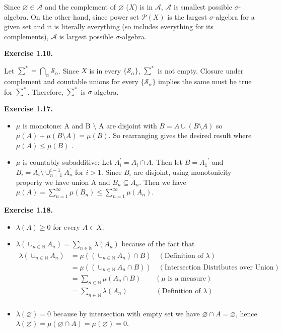 \documentclass[12pt]{article}
\renewcommand{\emptyset}{\varnothing}
\begin{document}
Since $\emptyset \in \mathcal{A}$ and the complement of $\emptyset$ ($X$) is in $\mathcal{A}$, $\mathcal{A}$ is smallest possible $\sigma$-algebra. On the other hand, since power set $\mathcal{P}(X)$ is the largest $\sigma$-algebra for a given set and it is literally everything (so includes everything for its complements), $\mathcal{A}$ is largest possible $\sigma$-algebra.

\textbf{Exercise 1.10.}

Let $\sum^{*} = \bigcap_\alpha \mathcal{S}_\alpha$. Since $X$ is in every $\{\mathcal{S}_\alpha\}$, $\sum^{*}$ is not empty. Closure under complement and countable unions for every  $\{\mathcal{S}_\alpha\}$ implies the same must be true for $\sum^{*}$.  Therefore,  $\sum^{*}$ is $\sigma$-algebra.

\textbf{Exercise 1.17.}

\begin{itemize}
\item $\mu$ is monotone: A and B $\setminus$ A are disjoint with $B = A \cup (B \setminus A)$ so $\mu(A) + \mu (B \setminus A) = \mu(B)$. So rearranging gives the desired result where $\mu(A) \leq \mu(B)$  .

\item  $\mu$ is countably subadditive: Let $A_{i}^{'} = A_{i} \cap A$. Then let $B = {A_{1}}^{'}$ and $B_{i} = A_{i}^{'} \setminus \cup_{n=1}^{i-1} A_{n}^{'}$ for $i>1$. Since $B_{i}$ are disjoint, using monotonicity property we have union A and $B_{n} \subseteq A_{n}$. Then we have $\mu(A) = \sum_{n=1}^{\infty} \mu({B_{n}}) \leq  \sum_{n=1}^{\infty} \mu({A_{n}})$.

\end{itemize}

\textbf{Exercise 1.18.}
\begin{itemize}
\item $\lambda(A) \geq 0$ for every $A \in X$.
\item $\lambda(\cup_{n \in \mathbb{N}} A_{n}) = \sum_{n \in \mathbb{N}} \lambda(A_{n})$ because of the fact that 
\begin{align*}
\lambda(\cup_{n \in \mathbb{N}} A_{n}) & = \mu((\cup_{n \in \mathbb{N}} A_{n}) \cap B) \quad (\text{Definition of $\lambda$})\\ & = \mu((\cup_{n \in \mathbb{N}} A_{n} \cap B)) \quad (\text{Intersection Distributes over Union})\\ & = \sum_{n \in \mathbb{N}} \mu(A_{n} \cap B)  \quad \quad (\text{$\mu$ is a measure}) \\ & = \sum_{n \in \mathbb{N}} \lambda(A_{n}) \quad \quad \quad \quad (\text{Definition of $\lambda$})\\
\end{align*}
\item  $\lambda(\emptyset) = 0$ because by intersection with empty set we have $\emptyset \cap A = \emptyset$, hence $\lambda(\emptyset) = \mu(\emptyset \cap A) =  \mu(\emptyset) = 0$.

\end{itemize}
\end{document}
